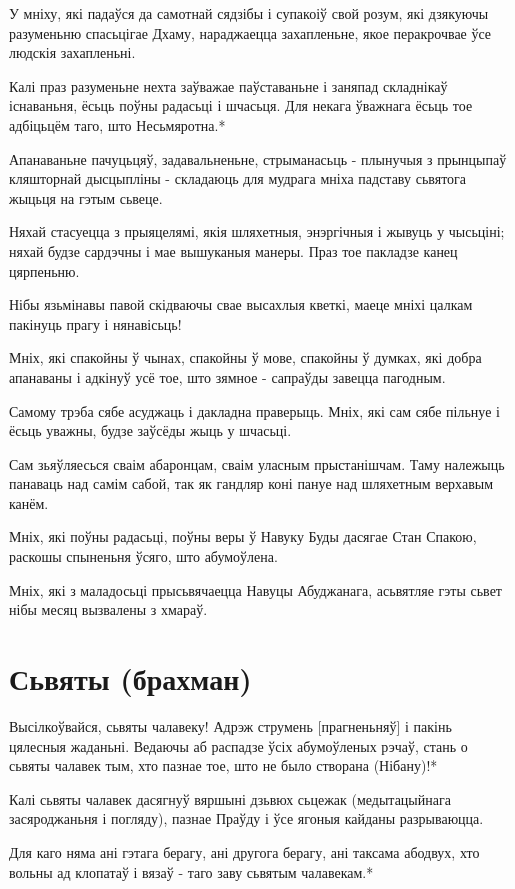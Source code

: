 \documentclass{article}
\begin{document}
У мніху, які падаўся да самотнай сядзібы і супакоіў свой розум, які
дзякуючы разуменьню спасьцігае Дхаму, нараджаецца захапленьне, якое
перакрочвае ўсе людскія захапленьні.

Калі праз разуменьне нехта заўважае паўставаньне і заняпад
складнікаў існаваньня, ёсьць поўны радасьці і шчасьця. Для некага
ўважнага ёсьць тое адбіцьцём таго, што Несьмяротна.*

Апанаваньне пачуцьцяў, задавальненьне, стрыманасьць - плынучыя з
прынцыпаў кляшторнай дысцыпліны - складаюць для мудрага мніха падставу
сьвятога жыцьця на гэтым сьвеце.

Няхай стасуецца з прыяцелямі, якія шляхетныя, энэргічныя і жывуць у
чысьціні; няхай будзе сардэчны і мае вышуканыя манеры. Праз тое пакладзе
канец цярпеньню.

Нібы язьмінавы павой скідваючы свае высахлыя кветкі, маеце мніхі
цалкам пакінуць прагу і нянавісьць!

Мніх, які спакойны ў чынах, спакойны ў мове, спакойны ў думках, які
добра апанаваны і адкінуў усё тое, што зямное - сапраўды завецца
пагодным.

Самому трэба сябе асуджаць і дакладна праверыць. Мніх, які сам сябе
пільнуе і ёсьць уважны, будзе заўсёды жыць у шчасьці.

Сам зьяўляесься сваім абаронцам, сваім уласным прыстанішчам. Таму
належыць панаваць над самім сабой, так як гандляр коні пануе над
шляхетным верхавым канём.

Мніх, які поўны радасьці, поўны веры ў Навуку Буды дасягае Стан
Спакою, раскошы спыненьня ўсяго, што абумоўлена.

Мніх, які з маладосьці прысьвячаецца Навуцы Абуджанага, асьвятляе
гэты сьвет нібы месяц вызвалены з хмараў.

\section{Сьвяты (брахман)}

Высілкоўвайся, сьвяты чалавеку! Адрэж струмень {[}прагненьняў{]} і
пакінь цялесныя жаданьні. Ведаючы аб распадзе ўсіх абумоўленых рэчаў,
стань о сьвяты чалавек тым, хто пазнае тое, што не было створана
(Нібану)!*

Калі сьвяты чалавек дасягнуў вяршыні дзьвюх сьцежак (медытацыйнага
засяроджаньня і погляду), пазнае Праўду і ўсе ягоныя кайданы
разрываюцца.

Для каго няма ані гэтага берагу, ані другога берагу, ані таксама
абодвух, хто вольны ад клопатаў і вязаў - таго заву сьвятым чалавекам.*
\end{document}
